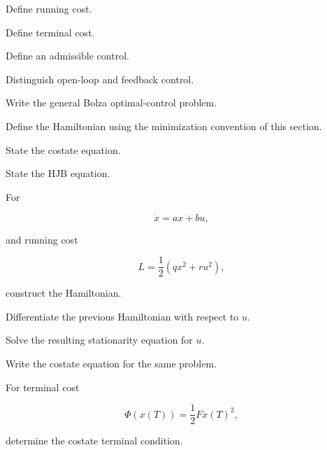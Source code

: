 \begin{exercise}[1]
Define running cost.
\end{exercise}

\begin{exercise}[1]
Define terminal cost.
\end{exercise}

\begin{exercise}[1]
Define an admissible control.
\end{exercise}

\begin{exercise}[1]
Distinguish open-loop and feedback control.
\end{exercise}

\begin{exercise}[1]
Write the general Bolza optimal-control problem.
\end{exercise}

\begin{exercise}[1]
Define the Hamiltonian using the minimization convention of this section.
\end{exercise}

\begin{exercise}[1]
State the costate equation.
\end{exercise}

\begin{exercise}[1]
State the HJB equation.
\end{exercise}

\begin{exercise}[2]
For

\[
\dot{x}=ax+bu,
\]

and running cost

\[
L=\frac12(qx^2+ru^2),
\]

construct the Hamiltonian.
\end{exercise}

\begin{exercise}[2]
Differentiate the previous Hamiltonian with respect to \(u\).
\end{exercise}

\begin{exercise}[2]
Solve the resulting stationarity equation for \(u\).
\end{exercise}

\begin{exercise}[2]
Write the costate equation for the same problem.
\end{exercise}

\begin{exercise}[2]
For terminal cost

\[
\Phi(x(T))
=
\frac12Fx(T)^2,
\]

determine the costate terminal condition.
\end{exercise}

